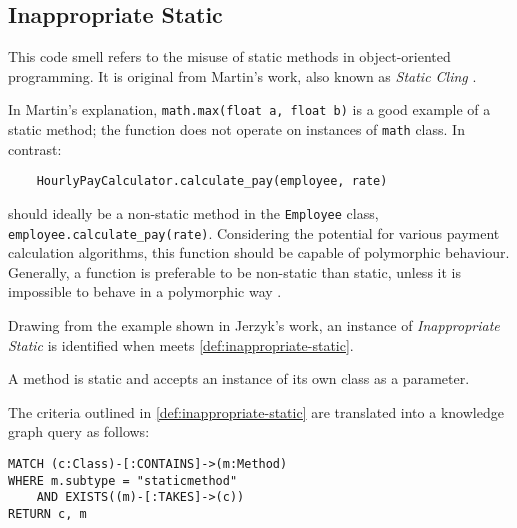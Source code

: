 \subsection{Inappropriate Static} 

This code smell refers to the misuse of static methods in object-oriented programming. It is original from Martin's work, also known as \textit{Static Cling} \cite{Martin_2008}.

In Martin's explanation, \texttt{math.max(float a, float b)} is a good example of a static method; the function does not operate on instances of \texttt{math} class. In contrast:

\begin{verbatim}
    HourlyPayCalculator.calculate_pay(employee, rate)
\end{verbatim}

should ideally be a non-static method in the \texttt{Employee} class, \ie \texttt{employee.calculate\_pay(rate)}. Considering the potential for various payment calculation algorithms, this function should be capable of polymorphic behaviour. Generally, a function is preferable to be non-static than static, unless it is impossible to behave in a polymorphic way \cite{Martin_2008}.

Drawing from the example shown in Jerzyk's work, an instance of \textit{Inappropriate Static} is identified when meets \autoref{def:inappropriate-static}.

\begin{definition}
A method is static and accepts an instance of its own class as a parameter.
\label{def:inappropriate-static}
\end{definition}

The criteria outlined in \autoref{def:inappropriate-static} are translated into a knowledge graph query as follows:

\begin{verbatim}
MATCH (c:Class)-[:CONTAINS]->(m:Method)
WHERE m.subtype = "staticmethod" 
    AND EXISTS((m)-[:TAKES]->(c))
RETURN c, m
\end{verbatim}
